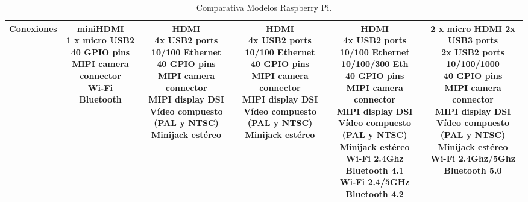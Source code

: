 \begin{landscape}
\begin{table}[]
{\begin{tabular}{|c|c|c|c|c|c|}
\rowcolor[HTML]{EFEFEF} 
\textbf{Conexiones} & 
\makecell{miniHDMI\\ 1 x micro USB2\\ 40 GPIO pins\\ MIPI camera connector\\ Wi-Fi\\ Bluetooth} & 
\makecell{HDMI\\ 4x USB2 ports\\ 10/100 Ethernet\\ 40 GPIO pins\\ MIPI camera connector\\ MIPI display DSI\\ Vídeo compuesto (PAL y NTSC) \\ Minijack estéreo} & 
\makecell{HDMI\\ 4x USB2 ports\\ 10/100 Ethernet\\ 40 GPIO pins\\ MIPI camera connector\\ MIPI display DSI\\ Vídeo compuesto (PAL y NTSC) \\Minijack estéreo} & 
\makecell{HDMI\\ 4x USB2 ports\\ 10/100 Ethernet\\ 10/100/300 Eth\\ 40 GPIO pins\\ MIPI camera connector\\ MIPI display DSI\\ Vídeo compuesto (PAL y NTSC) \\ Minijack estéreo\\ Wi-Fi 2.4Ghz\\ Bluetooth 4.1\\ Wi-Fi 2.4/5GHz\\ Bluetooth 4.2} & 
\makecell{2 x micro HDMI   2x USB3 ports\\ 2x USB2 ports\\ 10/100/1000\\ 40 GPIO pins\\ MIPI camera connector\\ MIPI display DSI\\ Vídeo compuesto (PAL y NTSC) \\ Minijack estéreo\\ Wi-Fi   2.4Ghz/5Ghz\\ Bluetooth 5.0} \\ \hline
\end{tabular}%
}
\caption{Comparativa Modelos Raspberry Pi.}
\label{tab:comp_RBP}
\end{table}
\end{landscape}



